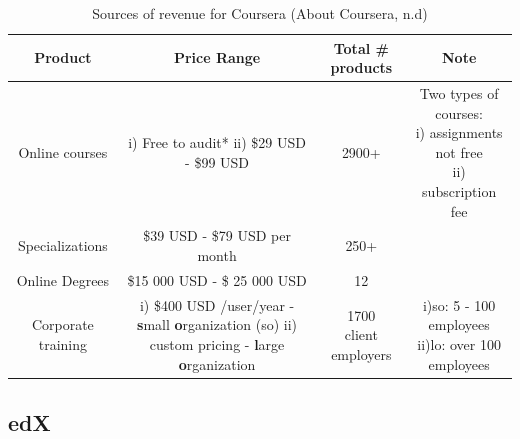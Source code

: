 \documentclass[11]{article}
\begin{document}
	\begin{table}
		\centering
		\begin{tabular}{|c|c|c|c|}
			\hline
				\textbf{Product} & \textbf{Price Range} & \textbf{Total \# products} & \textbf{Note} \\
			\hline
				Online courses & \makecell{i) Free to audit* \\ ii) \$29 USD - \$99 USD} & 2900+ & \makecell{Two types of courses:\\
																										i) assignments not free \\
																										ii) subscription fee } \\
			\hline
				Specializations & \makecell{\$39 USD - \$79 USD \\ per month} & 250+ & \\ 
			\hline
				Online Degrees & \$15 000 USD - \$ 25 000 USD & 12 & \\
			\hline
				Corporate training & \makecell{i) \$400 USD /user/year - \\ \textbf{s}mall \textbf{o}rganization (so)\\ ii) custom pricing - \\ \textbf{l}arge \textbf{o}rganization} & \makecell{1700 \\ client employers} &  \makecell{i)so: 5 - 100 employees\\ ii)lo: over 100 employees}\\
			\hline
		\end{tabular}	
		
		\caption{Sources of revenue for Coursera (About Coursera, n.d)}
		\label{revCoursera}
	\end{table}

\pagebreak

	\subsection{edX}
\end{document}
